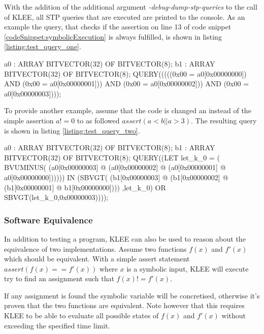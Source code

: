 With the addition of the additional argument \textit{-debug-dump-stp-queries} to the call of KLEE, all STP queries that are executed are printed to the console. As an example the query, that checks if the assertion on line 13 of code snippet \ref{codeSnippet:symbolicExecution} is always fulfilled, is shown in listing \ref{listing:test_query_one}.

\begin{customlisting}[caption={The query sent to STP when evaluation $assert(a!=0)$ from code snippet \ref{codeSnippet:symbolicExecution}}, label={listing:test_query_one}]
a0  : ARRAY BITVECTOR(32) OF BITVECTOR(8);
b1  : ARRAY BITVECTOR(32) OF BITVECTOR(8);
QUERY(((((0x00 = a0[0x00000000]) AND
         (0x00 = a0[0x00000001])) AND
         (0x00 = a0[0x00000002])) AND
         (0x00 = a0[0x00000003])));
\end{customlisting}

To provide another example, assume that the code is changed an instead of the simple assertion $a!=0$ to as followed $assert(a<b || a > 3)$. The resulting query is shown in listing \ref{listing:test_query_two}.

\begin{customlisting}[caption={The query sent to STP when evaluation $assert(a<b || a > 3)$}, label={listing:test_query_two}]
a0  : ARRAY BITVECTOR(32) OF BITVECTOR(8);
b1  : ARRAY BITVECTOR(32) OF BITVECTOR(8);
QUERY((LET let_k_0 = ( BVUMINUS( 
  (a0[0x00000003] @ (a0[0x00000002] @
  (a0[0x00000001] @ a0[0x00000000]))))) IN
(SBVGT(
  (b1[0x00000003] @ (b1[0x00000002] @
  (b1[0x00000001] @ b1[0x00000000])))
  ,let_k_0) 
OR SBVGT(let_k_0,0x00000003))));
\end{customlisting}


\subsubsection{Software Equivalence}\label{section:software_equivalence}
In addition to testing a program, KLEE can also be used to reason about the equivalence of two implementations. Assume two functions $f(x)$ and $f'(x)$ which should be equivalent. With a simple assert statement $assert(f(x) == f'(x))$ where $x$ is a symbolic input, KLEE will execute try to find an assignment such that $f(x) != f'(x)$.

If any assignment is found the symbolic variable will be concretised, otherwise it's proven that the two functions are equivalent. Note however that this requires KLEE to be able to evaluate all possible states of $f(x)$ and $f'(x)$ without exceeding the specified time limit.
